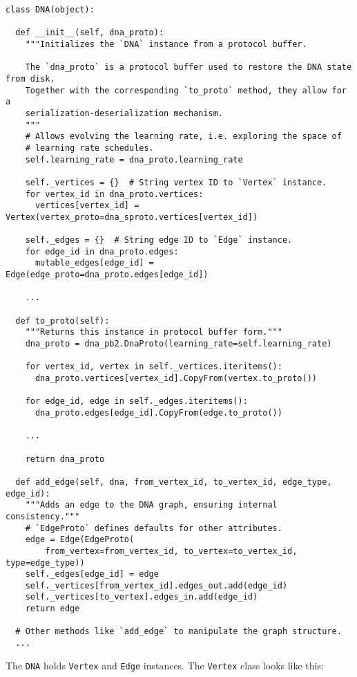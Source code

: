 \documentclass{article}
\begin{document}
\begin{lstlisting}
class DNA(object):

  def __init__(self, dna_proto):
    """Initializes the `DNA` instance from a protocol buffer.
    
    The `dna_proto` is a protocol buffer used to restore the DNA state from disk.
    Together with the corresponding `to_proto` method, they allow for a
    serialization-deserialization mechanism.
    """
    # Allows evolving the learning rate, i.e. exploring the space of
    # learning rate schedules.
    self.learning_rate = dna_proto.learning_rate
    
    self._vertices = {}  # String vertex ID to `Vertex` instance.
    for vertex_id in dna_proto.vertices:
      vertices[vertex_id] = Vertex(vertex_proto=dna_sproto.vertices[vertex_id])

    self._edges = {}  # String edge ID to `Edge` instance.
    for edge_id in dna_proto.edges:
      mutable_edges[edge_id] = Edge(edge_proto=dna_proto.edges[edge_id])
    
    ...
    
  def to_proto(self):
    """Returns this instance in protocol buffer form."""
    dna_proto = dna_pb2.DnaProto(learning_rate=self.learning_rate)

    for vertex_id, vertex in self._vertices.iteritems():
      dna_proto.vertices[vertex_id].CopyFrom(vertex.to_proto())

    for edge_id, edge in self._edges.iteritems():
      dna_proto.edges[edge_id].CopyFrom(edge.to_proto())
      
    ...

    return dna_proto
    
  def add_edge(self, dna, from_vertex_id, to_vertex_id, edge_type, edge_id):
    """Adds an edge to the DNA graph, ensuring internal consistency."""
    # `EdgeProto` defines defaults for other attributes.
    edge = Edge(EdgeProto(
        from_vertex=from_vertex_id, to_vertex=to_vertex_id, type=edge_type))
    self._edges[edge_id] = edge
    self._vertices[from_vertex_id].edges_out.add(edge_id)
    self._vertices[to_vertex].edges_in.add(edge_id)
    return edge
    
  # Other methods like `add_edge` to manipulate the graph structure.
  ...
\end{lstlisting}
The \lstinline{DNA} holds \lstinline{Vertex} and \lstinline{Edge} instances. The \lstinline{Vertex} class looks like this:
\smallskip
\end{document}
